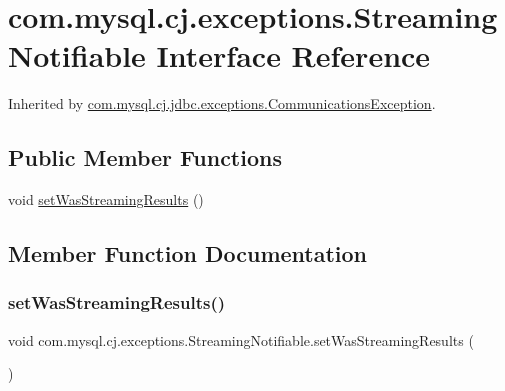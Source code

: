 \hypertarget{interfacecom_1_1mysql_1_1cj_1_1exceptions_1_1_streaming_notifiable}{}\section{com.\+mysql.\+cj.\+exceptions.\+Streaming\+Notifiable Interface Reference}
\label{interfacecom_1_1mysql_1_1cj_1_1exceptions_1_1_streaming_notifiable}


Inherited by \mbox{\hyperlink{classcom_1_1mysql_1_1cj_1_1jdbc_1_1exceptions_1_1_communications_exception}{com.\+mysql.\+cj.\+jdbc.\+exceptions.\+Communications\+Exception}}.

\subsection*{Public Member Functions}
\begin{DoxyCompactItemize}
\item 
void \mbox{\hyperlink{interfacecom_1_1mysql_1_1cj_1_1exceptions_1_1_streaming_notifiable_af8d92ff2c77b5b28ee8c6076e6a0d377}{set\+Was\+Streaming\+Results}} ()
\end{DoxyCompactItemize}


\subsection{Member Function Documentation}
\mbox{\label{interfacecom_1_1mysql_1_1cj_1_1exceptions_1_1_streaming_notifiable_af8d92ff2c77b5b28ee8c6076e6a0d377}} 
\subsubsection{\texorpdfstring{set\+Was\+Streaming\+Results()}{setWasStreamingResults()}}
{\footnotesize\ttfamily void com.\+mysql.\+cj.\+exceptions.\+Streaming\+Notifiable.\+set\+Was\+Streaming\+Results (\begin{DoxyParamCaption}{ }\end{DoxyParamCaption})}



